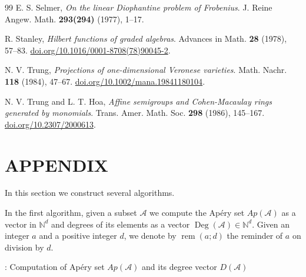 \documentclass[11pt]{article}
\def\Deg{\operatorname{Deg}}
\def\rem{\operatorname{rem}}
\def\Acal{{\mathcal A}}
\def\Nset{{\mathbb N}}
\theoremstyle{remark}
\theoremstyle{definition}
\begin{document}
\begin{thebibliography}{99}
 E. S. Selmer, {\it On the linear Diophantine problem of Frobenius}. J. Reine Angew. Math. {\bf 293(294)} (1977), 1--17. 

  R. Stanley, {\it Hilbert functions of graded algebras}. Advances in Math. {\bf 28} (1978),  57--83. \href{https://doi.org/10.1016/0001-8708(78)90045-2}{doi.org/10.1016/0001-8708(78)90045-2}.
 
  N. V. Trung, {\it  Projections of one-dimensional Veronese varieties}. Math. Nachr. {\bf 118} (1984), 47--67. \href{https://doi.org/10.1002/mana.19841180104}{doi.org/10.1002/mana.19841180104}.
 
  N. V. Trung and L. T. Hoa, {\it Affine semigroups and Cohen-Macaulay rings generated by monomials}. Trans. Amer. Math. Soc. {\bf 298} (1986), 145--167. \href{https://doi.org/10.2307/2000613}{doi.org/10.2307/2000613}.

\end{thebibliography}

\section*{APPENDIX}

In this section we construct several algorithms.

In the first algorithm, given a subset $\Acal$ we compute the Ap\'ery set $Ap(\Acal)$ as a vector in $ \Nset^{d}$ and degrees of its elements as a vector $\Deg(\Acal) \in \Nset^{d}$. Given an integer $a$ and a positive integer $d$, we denote by $\rem(a;d)$ the reminder of $a$ on division by $d$.
\vskip0.5cm

: 
Computation of  Ap\'ery set $Ap(\Acal)$ and its degree vector $D(\Acal)$\\
\end{document}
